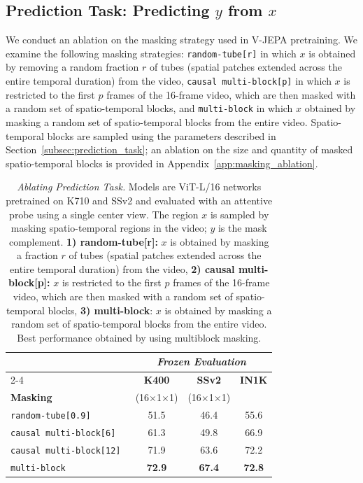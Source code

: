 \documentclass[twocolumn]{fairmeta}
\newcommand{\putalg}{{\small V-JEPA}\xspace}
\newcommand{\cc}{\cellcolor{metabg}}
\theoremstyle{plain}
\theoremstyle{definition}
\theoremstyle{remark}
\begin{document}
\subsection{Prediction Task: Predicting $y$ from $x$}
We conduct an ablation on the masking strategy used in \putalg pretraining.
We examine the following masking strategies: {\tt random-tube[r]} in which $x$ is obtained by removing a random fraction $r$ of tubes (spatial patches extended across the entire temporal duration) from the video, {\tt causal multi-block[p]} in which $x$ is restricted to the first $p$ frames of the 16-frame video, which are then masked with a random set of spatio-temporal blocks, and {\tt multi-block} in which $x$ obtained by masking a random set of spatio-temporal blocks from the entire video.
Spatio-temporal blocks are sampled using the parameters described in Section~\ref{subsec:prediction_task}; an ablation on the size and quantity of masked spatio-temporal blocks is provided in Appendix~\ref{app:masking_ablation}.
\begin{table}[t]
    \centering
    {
    \fontsize{8.5pt}{8.5pt}\selectfont
    \caption{{\it Ablating Prediction Task.} Models are ViT-L/16 networks pretrained on K710 and SSv2 and evaluated with an attentive probe using a single center view. The region $x$ is sampled by masking spatio-temporal regions in the video; $y$ is the mask complement.
    {\bf 1) random-tube[r]:} $x$ is obtained by masking a fraction $r$ of tubes (spatial patches extended across the entire temporal duration) from the video, {\bf 2) causal multi-block[p]:} $x$ is restricted to the first $p$ frames of the 16-frame video, which are then masked with a random set of spatio-temporal blocks, {\bf 3) multi-block}: $x$ is obtained by masking a random set of spatio-temporal blocks from the entire video. Best performance obtained by using multiblock masking.}
    \label{tb:masking}
    \begin{tabular}{l c c c}
        \toprule
        & \multicolumn{3}{c}{\it Frozen Evaluation} \\
        \cmidrule{2-4}
        & \bf K400 & \bf SSv2 & \bf IN1K \\
        \bf Masking & {\fontsize{5.5pt}{5.5pt}\selectfont(16$\times$1$\times$1)} & {\fontsize{5.5pt}{5.5pt}\selectfont(16$\times$1$\times$1)} & \\
        \midrule
        \tt random-tube[0.9] & 51.5 & 46.4 & 55.6 \\
        \tt causal multi-block[6] & 61.3 & 49.8 & 66.9 \\
        \tt causal multi-block[12] & 71.9 & 63.6 & 72.2 \\
        \tt multi-block & \cc\bf 72.9 & \cc\bf 67.4 & \cc\bf 72.8\\
        \bottomrule
    \end{tabular}}
\end{table}
\end{document}
